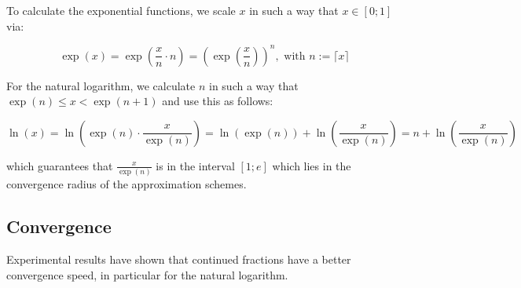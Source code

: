 \documentclass[11pt,a4paper,dvipsnames]{article}
\theoremstyle{definition}
\theoremstyle{definition}
\begin{document}
To calculate the exponential functions, we scale $x$ in such a way that
$x \in [0; 1]$ via:

\begin{equation*}
  \exp(x) = \exp
  \left(
    \frac{x}{n}\cdot n
  \right) =
  {\left(
      \exp{
        \left(
          \frac{x}{n}
        \right)}
    \right)}^{n}, \text{ with } n := \lceil x \rceil
\end{equation*}

For the natural logarithm, we calculate $n$ in such a way that
$\exp(n) \leq x < \exp(n+1)$ and use this as follows:

\begin{equation*}
  \ln(x) = \ln
  \left(
    \exp(n) \cdot \frac{x}{\exp(n)}
  \right) = \ln(\exp(n)) + \ln
  \left(
    \frac{x}{\exp(n)}
  \right) = n + \ln
  \left(
    \frac{x}{\exp(n)}
  \right)
\end{equation*}

which guarantees that $\frac{x}{\exp(n)}$ is in the interval $[1; e]$ which lies
in the convergence radius of the approximation schemes.

\subsection{Convergence}
\label{sec:convergence}

Experimental results have shown that continued fractions have a better
convergence speed, in particular for the natural logarithm.
\end{document}

